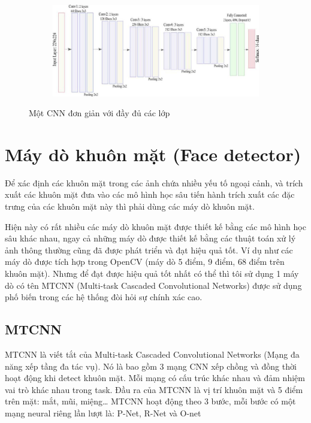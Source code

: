 \begin{figure}
    \begin{subfigure}{1.\textwidth}
        \begin{center}
            \includegraphics[width=1.\linewidth]{Chapters/items/chap2_8.jpg}
        \end{center}
        \label{fig:chap2_8}
    \end{subfigure}
    \caption{Một CNN đơn giản với đầy đủ các lớp}
\end{figure}

\newpage
\section{Máy dò khuôn mặt (Face detector)}

Để xác định các khuôn mặt trong các ảnh chứa nhiều yếu tố ngoại cảnh, và trích xuất các khuôn mặt đưa vào các
mô hình học sâu tiến hành trích xuất các đặc trưng của các khuôn mặt này thì phải dùng các máy dò khuôn mặt.

Hiện này có rất nhiều các máy dò khuôn mặt được thiết kế bằng các mô hình học sâu khác nhau, ngay cả những máy dò được
thiết kế bằng các thuật toán xử lý ảnh thông thường cũng đã được phát triển và đạt hiệu quả tốt.
Ví dụ như các máy dò được tích hợp trong OpenCV (máy dò 5 điểm, 9 điểm, 68 điểm trên khuôn mặt). Nhưng để đạt được hiệu quả
tốt nhất có thể thì tôi sử dụng 1 máy dò có tên MTCNN (Multi-task Cascaded Convolutional Networks) được sử dụng phố biến
trong các hệ thống đòi hỏi sự chính xác cao.

\subsection{MTCNN}

MTCNN là viết tắt của Multi-task Cascaded Convolutional Networks (Mạng đa năng xếp tầng đa tác vụ).
Nó là bao gồm 3 mạng CNN xếp chồng và đồng thời hoạt động khi detect khuôn mặt.
Mỗi mạng có cấu trúc khác nhau và đảm nhiệm vai trò khác nhau trong task.
Đầu ra của MTCNN là vị trí khuôn mặt và 5 điểm trên mặt: mắt, mũi, miệng…
\newpage
MTCNN hoạt động theo 3 bước, mỗi bước có một mạng neural riêng lần lượt là: P-Net, R-Net và O-net

